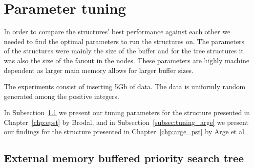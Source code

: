 \documentclass[twoside,11pt,openright]{report}
\begin{document}
\section{Parameter tuning}
In order to compare the structures' best performance against each other we needed to find the optimal parameters to run the structures on. The parameters of the structures were mainly the size of the buffer and for the tree structures it was also the size of the fanout in the nodes. These parameters are highly machine dependent as larger main memory allows for larger buffer sizes. 

The experiments consist of inserting 5Gb of data. The data is uniformly random generated among the positive integers.

In Subsection~\ref{subsec:tuning_gerth} we present our tuning parameters for the structure presented in Chapter~\ref{chp:epst} by Brodal, and in Subsection~\ref{subsec:tuning_arge} we present our findings for the structure presented in Chapter~\ref{chp:arge_pst} by Arge et al.

\subsection{External memory buffered priority search tree}
\label{subsec:tuning_gerth}
\end{document}
